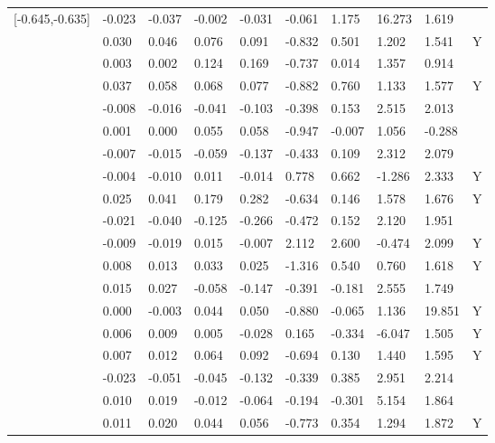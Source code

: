 \begin{table}[ht]
\begin{tabular}{llllllllll}
  [-0.645,-0.635] & -0.023 & -0.037 & -0.002 & -0.031 &  -0.061 &   1.175 &  16.273 &   1.619 &  \\ 
  [-0.635,-0.625] &  0.030 &  0.046 &  0.076 &  0.091 &  -0.832 &   0.501 &   1.202 &   1.541 & Y \\ 
  [-0.625,-0.615] &  0.003 &  0.002 &  0.124 &  0.169 &  -0.737 &   0.014 &   1.357 &   0.914 &  \\ 
  [-0.615,-0.605] &  0.037 &  0.058 &  0.068 &  0.077 &  -0.882 &   0.760 &   1.133 &   1.577 & Y \\ 
  [-0.605,-0.595] & -0.008 & -0.016 & -0.041 & -0.103 &  -0.398 &   0.153 &   2.515 &   2.013 &  \\ 
  [-0.595,-0.585] &  0.001 &  0.000 &  0.055 &  0.058 &  -0.947 &  -0.007 &   1.056 &  -0.288 &  \\ 
  [-0.585,-0.575] & -0.007 & -0.015 & -0.059 & -0.137 &  -0.433 &   0.109 &   2.312 &   2.079 &  \\ 
  [-0.575,-0.565] & -0.004 & -0.010 &  0.011 & -0.014 &   0.778 &   0.662 &  -1.286 &   2.333 & Y \\ 
  [-0.565,-0.555] &  0.025 &  0.041 &  0.179 &  0.282 &  -0.634 &   0.146 &   1.578 &   1.676 & Y \\ 
  [-0.555,-0.545] & -0.021 & -0.040 & -0.125 & -0.266 &  -0.472 &   0.152 &   2.120 &   1.951 &  \\ 
  [-0.545,-0.535] & -0.009 & -0.019 &  0.015 & -0.007 &   2.112 &   2.600 &  -0.474 &   2.099 & Y \\ 
  [-0.535,-0.525] &  0.008 &  0.013 &  0.033 &  0.025 &  -1.316 &   0.540 &   0.760 &   1.618 & Y \\ 
  [-0.525,-0.515] &  0.015 &  0.027 & -0.058 & -0.147 &  -0.391 &  -0.181 &   2.555 &   1.749 &  \\ 
  [-0.515,-0.505] &  0.000 & -0.003 &  0.044 &  0.050 &  -0.880 &  -0.065 &   1.136 &  19.851 & Y \\ 
  [-0.505,-0.495] &  0.006 &  0.009 &  0.005 & -0.028 &   0.165 &  -0.334 &  -6.047 &   1.505 & Y \\ 
  [-0.495,-0.485] &  0.007 &  0.012 &  0.064 &  0.092 &  -0.694 &   0.130 &   1.440 &   1.595 & Y \\ 
  [-0.485,-0.475] & -0.023 & -0.051 & -0.045 & -0.132 &  -0.339 &   0.385 &   2.951 &   2.214 &  \\ 
  [-0.475,-0.465] &  0.010 &  0.019 & -0.012 & -0.064 &  -0.194 &  -0.301 &   5.154 &   1.864 &  \\ 
  [-0.465,-0.455] &  0.011 &  0.020 &  0.044 &  0.056 &  -0.773 &   0.354 &   1.294 &   1.872 & Y \\ 

\end{tabular}
\end{table}

